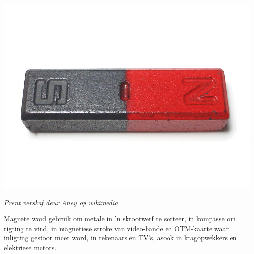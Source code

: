 \begin{minipage}{.5\textwidth}
\begin{center}
 \includegraphics[width=.8\textwidth]{photos/magnet.jpg}\par
\textit{Prent verskaf deur Aney op wikimedia}
\end{center}
\end{minipage}
      \label{m38706*id67200}Magnete word gebruik om metale in 'n skrootwerf te sorteer, in kompasse om rigting te vind, in magnetiese stroke van video-bande en OTM-kaarte waar inligting gestoor moet word, in rekenaars en TV's, asook in kragopwekkers en elektriese motors.
\par 
\label{m38706*secfhsst!!!underscore!!!id575}
